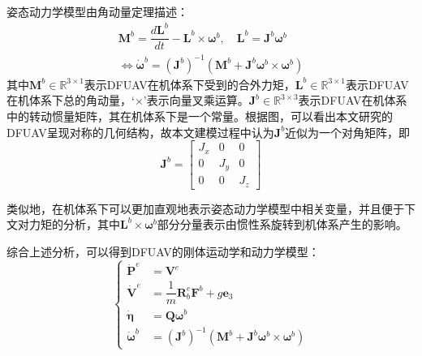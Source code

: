 姿态动力学模型由角动量定理描述：
\begin{equation}
    \begin{gathered}
    \boldsymbol{M}^{b}=\dfrac{d\boldsymbol{L}^{b}}{dt} - {\boldsymbol{L}^{b}}\times{\boldsymbol\omega^{b}},\quad \boldsymbol{L}^{b}=\boldsymbol{J}^{b}\boldsymbol\omega^{b}
    \\
    \Leftrightarrow\boldsymbol{\dot{\omega}}^b=(\boldsymbol{J}^b)^{-1}(\boldsymbol{M}^b+\boldsymbol{J}^b\boldsymbol{\omega}^b\times\boldsymbol{\omega}^b)
    \label{eq_8}
    \end{gathered}
\end{equation}
其中$\boldsymbol{M}^{b}\in\mathbb{R}^{3\times1}$表示DFUAV在机体系下受到的合外力矩，$\boldsymbol{L}^{b}\in\mathbb{R}^{3\times1}$表示DFUAV在机体系下总的角动量，‘$\times$’表示向量叉乘运算。$\boldsymbol{J}^{b}\in\mathbb{R}^{3\times3}$表示DFUAV在机体系中的转动惯量矩阵，其在机体系下是一个常量。根据图，可以看出本文研究的DFUAV呈现对称的几何结构，故本文建模过程中认为$\boldsymbol{J}^{b}$近似为一个对角矩阵，即
\begin{equation}
    \boldsymbol{J}^b=\begin{bmatrix}
        J_{x} & 0 & 0 \\
        0 & J_{y} & 0 \\
        0 & 0 & J_{z}
        \end{bmatrix}
    \label{eq_9}
\end{equation}

类似地，在机体系下可以更加直观地表示姿态动力学模型中相关变量，并且便于下文对力矩的分析，其中${\boldsymbol{L}^{b}}\times{\boldsymbol\omega^{b}}$部分分量表示由惯性系旋转到机体系产生的影响。

综合上述分析，可以得到DFUAV的刚体运动学和动力学模型：
\begin{equation}
    \left\{
    \begin{aligned}
        \boldsymbol{\dot{P}}^{e} &= \boldsymbol{V}^{e} \\
        \dot{\boldsymbol{V}}^e&=\dfrac{1}{m}\boldsymbol{R}_b^e\boldsymbol{F}^b + g\boldsymbol{e}_3 \\
        \dot{\boldsymbol{\eta}}&=\boldsymbol{Q}\boldsymbol{\omega}^b \\
        \boldsymbol{\dot{\omega}}^b&=(\boldsymbol{J}^b)^{-1}(\boldsymbol{M}^b+\boldsymbol{J}^b\boldsymbol{\omega}^b\times\boldsymbol{\omega}^b)
    \end{aligned}
    \right.
    \label{eq_10}
\end{equation}

